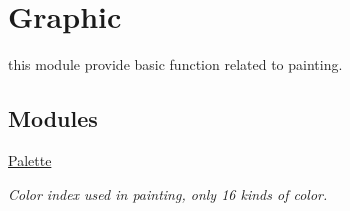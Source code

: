 \hypertarget{group__graphic}{}\section{Graphic}
\label{group__graphic}


this module provide basic function related to painting.  


\subsection*{Modules}
\begin{DoxyCompactItemize}
\item 
\hyperlink{group__palette}{Palette}
\begin{DoxyCompactList}\small\item\em Color index used in painting, only 16 kinds of color. \end{DoxyCompactList}\end{DoxyCompactItemize}
